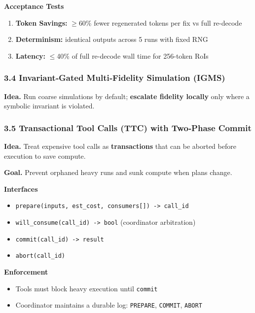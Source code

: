 \documentclass[
]{article}
\begin{document}
\textbf{Acceptance Tests}
\begin{enumerate}
\item \textbf{Token Savings:} \ensuremath{\geq}60\% fewer regenerated
  tokens per fix vs full re-decode
\item \textbf{Determinism:} identical outputs across 5 runs with fixed
  RNG
\item \textbf{Latency:} \ensuremath{\leq}40\% of full re-decode wall
  time for 256-token RoIs
\end{enumerate}

\hypertarget{invariantgated-multifidelity-simulation-igms}{%
\subsubsection{3.4 Invariant‑Gated Multi‑Fidelity Simulation
(IGMS)}\label{invariantgated-multifidelity-simulation-igms}}

\textbf{Idea.} Run coarse simulations by default; \textbf{escalate
fidelity locally} only where a symbolic invariant is violated.

\hypertarget{transactional-tool-calls-ttc-with-twophase-commit}{%
\subsubsection{3.5 Transactional Tool Calls (TTC) with Two‑Phase
Commit}\label{transactional-tool-calls-ttc-with-twophase-commit}}

\textbf{Idea.} Treat expensive tool calls as \textbf{transactions} that
can be aborted before execution to save compute.

\textbf{Goal.} Prevent orphaned heavy runs and sunk compute when plans
change.

\textbf{Interfaces}
\begin{itemize}
\item \texttt{prepare(inputs, est\_cost, consumers[]) -> call\_id}
\item \texttt{will\_consume(call\_id) -> bool} (coordinator arbitration)
\item \texttt{commit(call\_id) -> result}
\item \texttt{abort(call\_id)}
\end{itemize}

\textbf{Enforcement}
\begin{itemize}
\item Tools must block heavy execution until \texttt{commit}
\item Coordinator maintains a durable log: \texttt{PREPARE},
  \texttt{COMMIT}, \texttt{ABORT}
\end{itemize}
\end{document}
